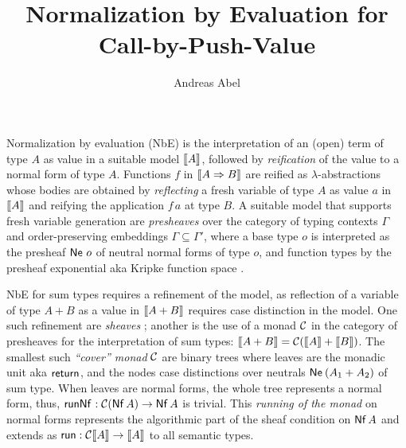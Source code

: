 \documentclass[a4paper]{easychair}
\begin{document}
\title{Normalization by Evaluation for Call-by-Push-Value}
\author{Andreas Abel}


\maketitle


\noindent

Normalization by evaluation (NbE) \citep{bergerSchwichtenberg:lics91}
is the interpretation of
an (open) term of type $A$ as value in a suitable model $\mathopen{{[\kern-0.14em[}} A \mathclose{{]\kern-0.14em]}}$,
followed by \emph{reification} of the value to a normal form of type
$A$.  Functions $f$ in $\mathopen{{[\kern-0.14em[}} A \Rightarrow B \mathclose{{]\kern-0.14em]}}$ are reified as
$\lambda$-abstractions whose bodies are obtained
by \emph{reflecting} a fresh variable of type $A$ as value $a$ in
$\mathopen{{[\kern-0.14em[}} A \mathclose{{]\kern-0.14em]}}$ and reifying the application $f\,a$ at type $B$.
A suitable model that supports fresh variable generation
are \emph{presheaves} over the category of
typing contexts $\Gamma$ and order-preserving embeddings
$\Gamma \subseteq \Gamma'$, where a base type $o$ is interpreted as
the presheaf $\mathsf{Ne}^{}\;o$ of neutral normal forms of type $o$, and
function types by the presheaf exponential aka Kripke function space
\citep{catarina:csl93,altenkirchHofmannStreicher:ctcs95}.

NbE for sum types requires a refinement of the model, as reflection of
a variable of type $A + B$ as a value in $\mathopen{{[\kern-0.14em[}} A + B \mathclose{{]\kern-0.14em]}}$ requires case
distinction in the model.  One such refinement are \emph{sheaves}
\citep{altenkirchDybjerHofmannScott:lics01}; another is the use of a
monad $\mathcal{C}$
\citep{filinski:semaccounttdpe,filinski:tlca01,barral:PhD}
in the category of presheaves
for the interpretation of sum types:
$\mathopen{{[\kern-0.14em[}} A + B \mathclose{{]\kern-0.14em]}} = \mathcal{C}(\mathopen{{[\kern-0.14em[}} A \mathclose{{]\kern-0.14em]}} + \mathopen{{[\kern-0.14em[}} B \mathclose{{]\kern-0.14em]}})$.
The smallest such \emph{``cover'' monad} $\mathcal{C}$ are binary trees where leaves are
the monadic unit aka $\mathsf{return}^{}$, and the nodes case distinctions
over neutrals $\mathsf{Ne}^{}\,(A_1 + A_2)$ of sum type.  When leaves are normal
forms, the whole tree represents a normal form, thus,
$\mathsf{runNf}^{} : \mathcal{C}(\mathsf{Nf}\,A) \to \mathsf{Nf}\,A$ is trivial.
This \emph{running of the monad}
on normal forms represents the algorithmic part of the sheaf condition
on $\mathsf{Nf}\,A$ and extends as $\mathsf{run} : \mathcal{C} \mathopen{{[\kern-0.14em[}} A \mathclose{{]\kern-0.14em]}} \to \mathopen{{[\kern-0.14em[}} A \mathclose{{]\kern-0.14em]}}$ to all
semantic types.
\end{document}
